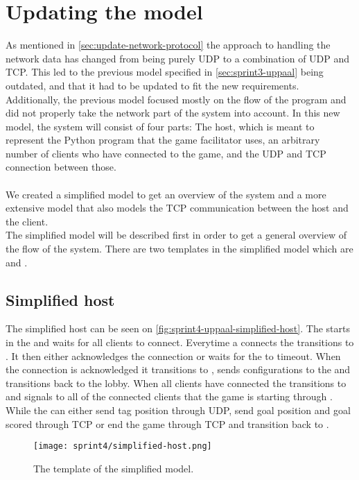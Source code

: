 \section{Updating the \uppaal model}
As mentioned in \autoref{sec:update-network-protocol} the approach to handling the network data has changed from being purely UDP to a combination of UDP and TCP.
This led to the previous \uppaal model specified in \autoref{sec:sprint3-uppaal} being outdated, and that it had to be updated to fit the new requirements.
\\
Additionally, the previous model focused mostly on the flow of the program and did not properly take the network part of the system into account.
In this new model, the system will consist of four parts: The host, which is meant to represent the Python program that the game facilitator uses, an arbitrary number of clients who have connected to the game, and the UDP and TCP connection between those.
\\\\
We created a simplified model to get an overview of the system and a more extensive model that also models the TCP communication between the host and the client.
\\
The simplified model will be described first in order to get a general overview of the flow of the system.
There are two templates in the simplified model which are  and .

\subsection*{Simplified host}
The simplified host can be seen on \autoref{fig:sprint4-uppaal-simplified-host}. 
The  starts in the  and waits for all clients to connect.
Everytime a  connects the  transitions to  .
It then either acknowledges the connection or waits for the   to timeout.
When the connection is acknowledged it transitions to , sends configurations to the  and transitions back to the lobby.
When all clients have connected the  transitions to  and signals to all of the connected clients that the game is starting through .
While  the  can either send tag position through UDP, send goal position and goal scored through TCP or end the game through TCP and transition back to .
\begin{figure}[h]
    \centering
    \texttt{[image: sprint4/simplified-host.png]}
    \caption{The  template of the simplified \uppaal model.}
    \label{fig:sprint4-uppaal-simplified-host}
\end{figure}

